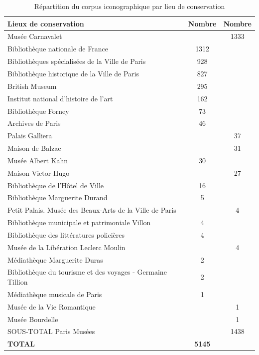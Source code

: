
\begin{table}[ht!]
\centering
\begin{tabular}{|l|c|c|}
\toprule
\textbf{Lieux de conservation} & \textbf{Nombre} & \textbf{Nombre} \\
\midrule
Musée Carnavalet & & 1333 \\
Bibliothèque nationale de France & 1312 & \\
Bibliothèques spécialisées de la Ville de Paris & 928 & \\
Bibliothèque historique de la Ville de Paris & 827 & \\
British Museum & 295 & \\
Institut national d'histoire de l'art & 162 & \\
Bibliothèque Forney & 73 & \\
Archives de Paris & 46 & \\
Palais Galliera & & 37 \\
Maison de Balzac & & 31 \\
Musée Albert Kahn & 30 & \\
Maison Victor Hugo & & 27 \\
Bibliothèque de l'Hôtel de Ville & 16 & \\
Bibliothèque Marguerite Durand & 5 & \\
Petit Palais. Musée des Beaux-Arts de la Ville de Paris & & 4 \\
Bibliothèque municipale et patrimoniale Villon & 4 & \\
Bibliothèque des littératures policières & 4 & \\
Musée de la Libération Leclerc Moulin & & 4 \\
Médiathèque Marguerite Duras & 2 & \\
Bibliothèque du tourisme et des voyages - Germaine Tillion & 2 & \\
Médiathèque musicale de Paris & 1 & \\
Musée de la Vie Romantique & & 1 \\
Musée Bourdelle & & 1 \\
\midrule
SOUS-TOTAL Paris Musées & & 1438 \\
\textbf{TOTAL} &  \textbf{5145} & \\
\bottomrule
\end{tabular}
\caption{Répartition du corpus iconographique par lieu de conservation}
\label{tab:iconographie_institution}
\end{table}

